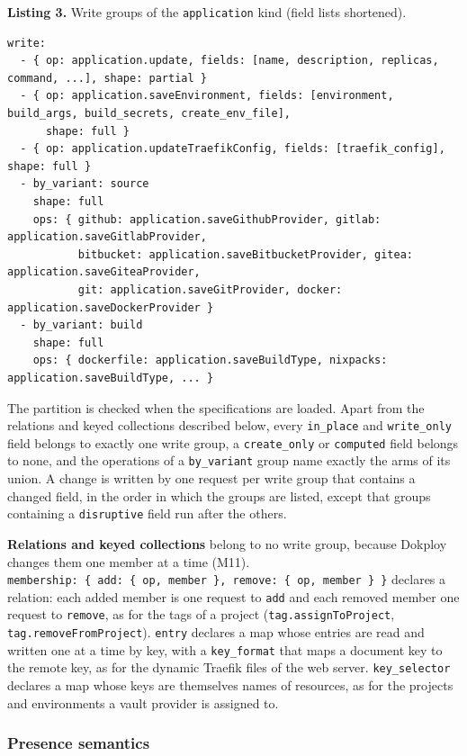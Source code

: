 \textbf{Listing 3.} Write groups of the \texttt{application} kind (field lists shortened).

\begin{lstlisting}
write:
  - { op: application.update, fields: [name, description, replicas, command, ...], shape: partial }
  - { op: application.saveEnvironment, fields: [environment, build_args, build_secrets, create_env_file],
      shape: full }
  - { op: application.updateTraefikConfig, fields: [traefik_config], shape: full }
  - by_variant: source
    shape: full
    ops: { github: application.saveGithubProvider, gitlab: application.saveGitlabProvider,
           bitbucket: application.saveBitbucketProvider, gitea: application.saveGiteaProvider,
           git: application.saveGitProvider, docker: application.saveDockerProvider }
  - by_variant: build
    shape: full
    ops: { dockerfile: application.saveBuildType, nixpacks: application.saveBuildType, ... }
\end{lstlisting}

The partition is checked when the specifications are loaded. Apart from the relations and keyed
collections described below, every \texttt{in\_place} and \texttt{write\_only} field belongs to exactly one write
group, a \texttt{create\_only} or \texttt{computed} field belongs to none, and the operations of a \texttt{by\_variant} group
name exactly the arms of its union. A change is written by one request per write group that contains a
changed field, in the order in which the groups are listed, except that groups containing a
\texttt{disruptive} field run after the others.

\textbf{Relations and keyed collections} belong to no write group, because Dokploy changes them one member
at a time (M11). \texttt{membership:\ \{\ add:\ \{\ op,\ member\ \},\ remove:\ \{\ op,\ member\ \}\ \}} declares a relation:
each added member is one request to \texttt{add} and each removed member one request to \texttt{remove}, as for the
tags of a project (\texttt{tag.assignToProject}, \texttt{tag.removeFromProject}). \texttt{entry} declares a map whose
entries are read and written one at a time by key, with a \texttt{key\_format} that maps a document key to the
remote key, as for the dynamic Traefik files of the web server. \texttt{key\_selector} declares a map whose
keys are themselves names of resources, as for the projects and environments a vault provider is
assigned to.

\subsubsection*{Presence semantics}

